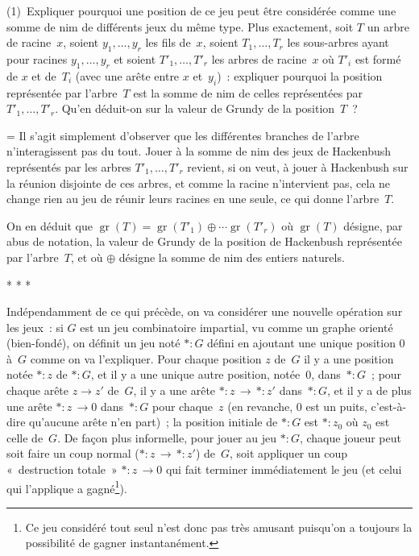 \documentclass[12pt,a4paper]{article}
\theoremstyle{definition}
\newcommand{\gr}{\operatorname{gr}}
\newif\ifcorrige
\newenvironment{corrige}%
{\ifcorrige\relax\else\setbox0=\vbox\bgroup\fi%
\smallbreak\noindent{\underbar{\textit{Corrigé.}}\quad}}
{{\hbox{}\nobreak\hfill\checkmark}%
\ifcorrige\relax\else\egroup\fi\par}
\begin{document}
(1) Expliquer pourquoi une position de ce jeu peut être considérée
comme une somme de nim de différents jeux du même type.  Plus
exactement, soit $T$ un arbre de racine $x$, soient $y_1,\ldots,y_r$
les fils de $x$, soient $T_1,\ldots,T_r$ les sous-arbres ayant pour
racines $y_1,\ldots,y_r$ et soient $T'_1,\ldots,T'_r$ les arbres de
racine $x$ où $T'_i$ est formé de $x$ et de $T_i$ (avec une arête
entre $x$ et $y_i$) : expliquer pourquoi la position représentée par
l'arbre $T$ est la somme de nim de celles représentées par
$T'_1,\ldots,T'_r$.  Qu'en déduit-on sur la valeur de Grundy de la
position $T$ ?

\begin{corrige}
Il s'agit simplement d'observer que les différentes branches de
l'arbre n'interagissent pas du tout.  Jouer à la somme de nim des jeux
de Hackenbush représentés par les arbres $T'_1,\ldots,T'_r$ revient,
si on veut, à jouer à Hackenbush sur la réunion disjointe de ces
arbres, et comme la racine n'intervient pas, cela ne change rien au
jeu de réunir leurs racines en une seule, ce qui donne l'arbre $T$.

On en déduit que $\gr(T) = \gr(T'_1) \oplus \cdots \gr(T'_r)$ où
$\gr(T)$ désigne, par abus de notation, la valeur de Grundy de la
position de Hackenbush représentée par l'arbre $T$, et où $\oplus$
désigne la somme de nim des entiers naturels.
\end{corrige}

\smallbreak

\centerline{* * *}

Indépendamment de ce qui précède, on va considérer une nouvelle
opération sur les jeux : si $G$ est un jeu combinatoire impartial, vu
comme un graphe orienté (bien-fondé), on définit un jeu noté $*{:}G$
défini en ajoutant une unique position $0$ à $G$ comme on va
l'expliquer.  Pour chaque position $z$ de $G$ il y a une position
notée $*{:}z$ de $*{:}G$, et il y a une unique autre position,
notée $0$, dans $*{:}G$ ; pour chaque arête $z \to z'$ de $G$, il y a
une arête $*{:}z\, \to \, *{:}z'$ dans $*{:}G$, et il y a de plus une
arête $*{:}z\, \to 0$ dans $*{:}G$ pour chaque $z$ (en revanche, $0$
est un puits, c'est-à-dire qu'aucune arête n'en part) ; la position
initiale de $*{:}G$ est $*{:}z_0$ où $z_0$ est celle de $G$.  De façon
plus informelle, pour jouer au jeu $*{:}G$, chaque joueur peut soit
faire un coup normal ($*{:}z\, \to \, *{:}z'$) de $G$, soit appliquer
un coup « destruction totale » $*{:}z\, \to 0$ qui fait terminer
immédiatement le jeu (et celui qui l'applique a gagné\footnote{Ce jeu
  considéré tout seul n'est donc pas très amusant puisqu'on a toujours
  la possibilité de gagner instantanément.}).
\end{document}
